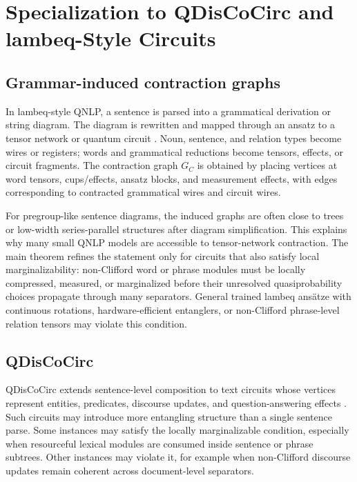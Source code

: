 \section{Specialization to QDisCoCirc and lambeq-Style Circuits}
\label{sec:qnlp}

\subsection{Grammar-induced contraction graphs}

In lambeq-style QNLP, a sentence is parsed into a grammatical derivation or string diagram. The diagram is rewritten and mapped through an ansatz to a tensor network or quantum circuit \citep{KartsaklisEtAl2021}. Noun, sentence, and relation types become wires or registers; words and grammatical reductions become tensors, effects, or circuit fragments. The contraction graph \(G_C\) is obtained by placing vertices at word tensors, cups/effects, ansatz blocks, and measurement effects, with edges corresponding to contracted grammatical wires and circuit wires.

For pregroup-like sentence diagrams, the induced graphs are often close to trees or low-width series-parallel structures after diagram simplification. This explains why many small QNLP models are accessible to tensor-network contraction. The main theorem refines the statement only for circuits that also satisfy local marginalizability: non-Clifford word or phrase modules must be locally compressed, measured, or marginalized before their unresolved quasiprobability choices propagate through many separators. General trained lambeq ans\"atze with continuous rotations, hardware-efficient entanglers, or non-Clifford phrase-level relation tensors may violate this condition.

\subsection{QDisCoCirc}

QDisCoCirc extends sentence-level composition to text circuits whose vertices represent entities, predicates, discourse updates, and question-answering effects \citep{LaakkonenMeichanetzidisCoecke2024}. Such circuits may introduce more entangling structure than a single sentence parse. Some instances may satisfy the locally marginalizable condition, especially when resourceful lexical modules are consumed inside sentence or phrase subtrees. Other instances may violate it, for example when non-Clifford discourse updates remain coherent across document-level separators.

